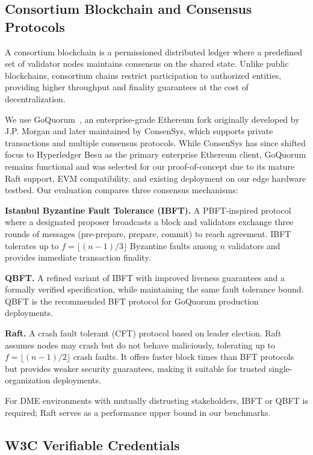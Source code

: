 \subsection{Consortium Blockchain and Consensus Protocols}
\label{sec:prelim-blockchain}

A consortium blockchain is a permissioned distributed ledger where a predefined set of validator nodes maintains consensus on the shared state.
Unlike public blockchains, consortium chains restrict participation to authorized entities, providing higher throughput and finality guarantees at the cost of decentralization.

We use GoQuorum~\cite{wells2023hotstuff_goquorum}, an enterprise-grade Ethereum fork originally developed by J.P. Morgan and later maintained by ConsenSys, which supports private transactions and multiple consensus protocols.
While ConsenSys has since shifted focus to Hyperledger Besu as the primary enterprise Ethereum client, GoQuorum remains functional and was selected for our proof-of-concept due to its mature Raft support, EVM compatibility, and existing deployment on our edge hardware testbed.
Our evaluation compares three consensus mechanisms:

\textbf{Istanbul Byzantine Fault Tolerance (IBFT).}
A PBFT-inspired protocol where a designated proposer broadcasts a block and validators exchange three rounds of messages (pre-prepare, prepare, commit) to reach agreement.
IBFT tolerates up to $f = \lfloor (n-1)/3 \rfloor$ Byzantine faults among $n$ validators and provides immediate transaction finality.

\textbf{QBFT.}
A refined variant of IBFT with improved liveness guarantees and a formally verified specification, while maintaining the same fault tolerance bound.
QBFT is the recommended BFT protocol for GoQuorum production deployments.

\textbf{Raft.}
A crash fault tolerant (CFT) protocol based on leader election.
Raft assumes nodes may crash but do not behave maliciously, tolerating up to $f = \lfloor (n-1)/2 \rfloor$ crash faults.
It offers faster block times than BFT protocols but provides weaker security guarantees, making it suitable for trusted single-organization deployments.

For DME environments with mutually distrusting stakeholders, IBFT or QBFT is required; Raft serves as a performance upper bound in our benchmarks.

\subsection{W3C Verifiable Credentials}
\label{sec:prelim-vc}

